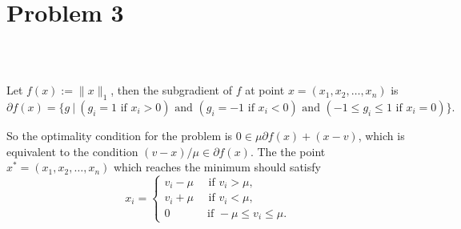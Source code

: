 \section{Problem 3}~\label{sec:prob3}

\subsection{} %

Let $f(x):=\|x\|_1$,
then the subgradient of $f$ at point $x=(x_1,x_2,\dots,x_n)$ is
\begin{equation}
\partial f(x)=\{g~|~(g_i = 1 \text{ if } x_i>0)
\text{ and } (g_i = -1  \text{ if } x_i<0)
\text{ and } (-1\le g_i \le 1  \text{ if } x_i=0)
\}.
\end{equation}

So the optimality condition for the problem is
$0\in \mu\partial f(x) + (x-v)$,
which is equivalent to the condition $(v-x)/\mu \in\partial f(x)$.
The the point $x^*=(x_1,x_2,\dots,x_n)$
which reaches the minimum should satisfy
\begin{equation}
x_i=
\begin{cases}
v_i-\mu \quad \text{ if } v_i> \mu,\\
v_i+\mu \quad \text{ if } v_i< \mu,\\
0  \quad \quad \quad \text{ if } -\mu\le v_i\le \mu.
\end{cases}
\end{equation}

\subsection{} %

